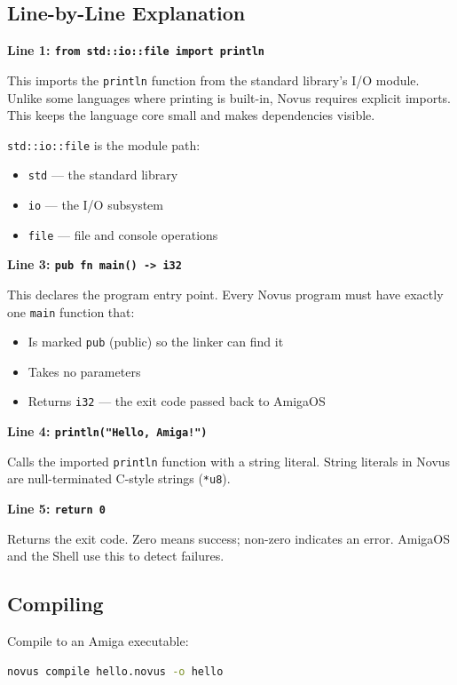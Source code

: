 \subsection{Line-by-Line Explanation}

\textbf{Line 1: \texttt{from std::io::file import println}}

This imports the \texttt{println} function from the standard library's I/O module. Unlike some languages where printing is built-in, Novus requires explicit imports. This keeps the language core small and makes dependencies visible.

\texttt{std::io::file} is the module path:
\begin{itemize}
    \item \texttt{std} --- the standard library
    \item \texttt{io} --- the I/O subsystem
    \item \texttt{file} --- file and console operations
\end{itemize}

\textbf{Line 3: \texttt{pub fn main() -> i32}}

This declares the program entry point. Every Novus program must have exactly one \texttt{main} function that:
\begin{itemize}
    \item Is marked \texttt{pub} (public) so the linker can find it
    \item Takes no parameters
    \item Returns \texttt{i32} --- the exit code passed back to AmigaOS
\end{itemize}

\textbf{Line 4: \texttt{println("Hello, Amiga!")}}

Calls the imported \texttt{println} function with a string literal. String literals in Novus are null-terminated C-style strings (\texttt{*u8}).

\textbf{Line 5: \texttt{return 0}}

Returns the exit code. Zero means success; non-zero indicates an error. AmigaOS and the Shell use this to detect failures.

\subsection{Compiling}

Compile to an Amiga executable:

\begin{lstlisting}[language=bash]
novus compile hello.novus -o hello
\end{lstlisting}

